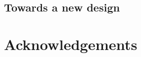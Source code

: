 \documentclass{IEEEtran}
\begin{document}
% 

% 
% 
% 
% 
% 
% 
% 



\subsection{Towards a new design}

\section*{Acknowledgements} 




\end{document}
